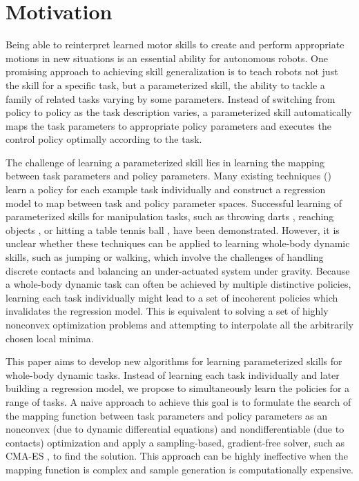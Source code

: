 \section{Motivation}

Being able to reinterpret learned motor skills to create and perform
appropriate motions in new situations is an essential ability for
autonomous robots. One promising approach to achieving skill
generalization is to teach robots not just the skill for a specific
task, but a parameterized skill, the ability to tackle a family of
related tasks varying by some parameters. Instead of switching from
policy to policy as the task description varies, a parameterized skill
automatically maps the task parameters to appropriate policy
parameters and executes the control policy optimally according to the
task.

The challenge of learning a parameterized skill lies in learning the
mapping between task parameters and policy parameters. Many existing
techniques (\cite{Stulp:2013:LCP,DaSilva:2014:LPM}) learn a policy for
each example task individually and construct a regression model to map
between task and policy parameter spaces. Successful learning of
parameterized skills for manipulation tasks, such as throwing darts
\cite{Kober:2010:RLA,DaSilva:2012:LPS}, reaching objects
\cite{Ude:2010:TSG,Matsubara:2011:LPD,Forte:2012:OMS}, or hitting a
table tennis ball \cite{Kober:2010:RLA}, have been demonstrated.
However, it is unclear whether these techniques can be applied to
learning whole-body dynamic skills, such as jumping or walking, which
involve the challenges of handling discrete contacts and balancing an
under-actuated system under gravity.  Because a whole-body dynamic
task can often be achieved by multiple distinctive policies, learning
each task individually might lead to a set of incoherent policies
which invalidates the regression model. This is equivalent to solving
a set of highly nonconvex optimization problems and attempting to
interpolate all the arbitrarily chosen local minima.

This paper aims to develop new algorithms for learning parameterized
skills for whole-body dynamic tasks. Instead of learning each task
individually and later building a regression model, we propose to
simultaneously learn the policies for a range of tasks. A naive
approach to achieve this goal is to formulate the search of the
mapping function between task parameters and policy parameters as an
nonconvex (due to dynamic differential equations) and
nondifferentiable (due to contacts) optimization and apply a
sampling-based, gradient-free solver, such as CMA-ES \cite{Hansen:2003:CMA}, to
find the solution. This approach can be highly ineffective when the mapping
function is complex and sample generation is computationally
expensive.


